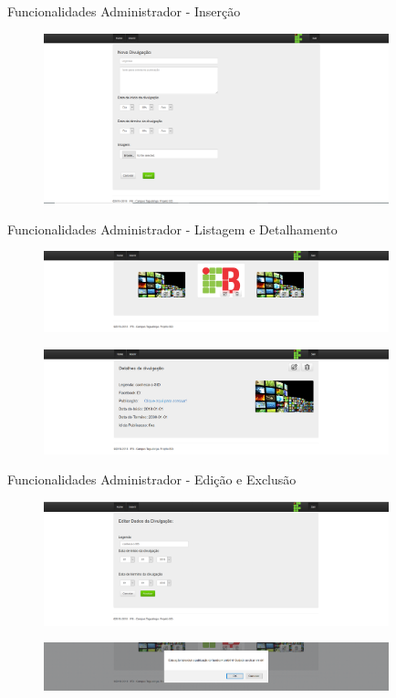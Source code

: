 \documentclass{aula-ifb}
\begin{document}
\begin{frame}{Funcionalidades Administrador - Inserção}
\begin{figure}[h]
\includegraphics[width=10cm]{figuras/funcionalidadeinserir.png}
\label{fig:facebookgraph}
\end{figure}
\end{frame}

\begin{frame}{Funcionalidades Administrador - Listagem e Detalhamento}
\begin{figure}[h]
\includegraphics[width=10cm]{figuras/funcionalidadelistar.png}
\label{fig:facebookgraph}
\end{figure}
\begin{figure}[h]
\includegraphics[width=10cm]{figuras/funcionalidadedetalhar.png}
\label{fig:facebookgraph}
\end{figure}
\end{frame}

\begin{frame}{Funcionalidades Administrador - Edição e Exclusão}
\begin{figure}[h]
\includegraphics[width=10cm]{figuras/funcionalidadeeditar.png}
\label{fig:facebookgraph}
\end{figure}

\begin{figure}[h]
\includegraphics[width=10cm]{figuras/funcionalidadedeletar.png}
\label{fig:facebookgraph}
\end{figure}
\end{frame}
\end{document}
